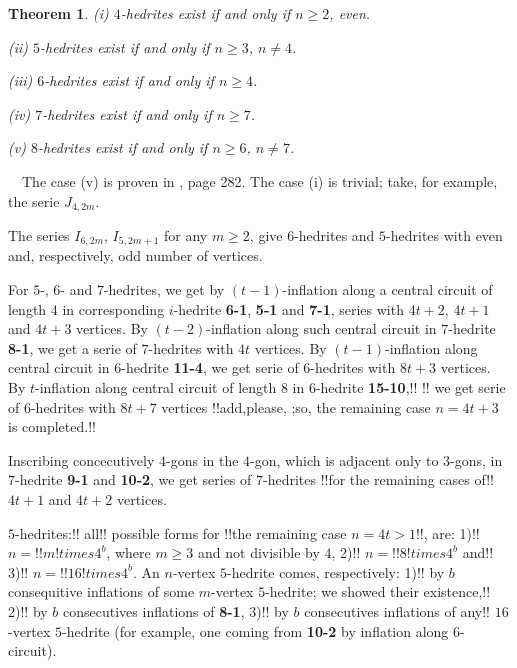 \documentclass[12pt]{article}
\newtheorem{theorem}{Theorem}
\newcommand{\proof}{\noindent{\bf Proof.}\ \ }
\begin{document}
\begin{theorem}

(i) $4$-hedrites exist if and only if $n\geq 2$, even.

(ii) $5$-hedrites exist if and only if $n\geq 3$, $n\not= 4$.

(iii) $6$-hedrites exist if and only if $n\geq 4$.

(iv) $7$-hedrites exist if and only if $n\geq 7$.

(v) $8$-hedrites exist if and only if $n\geq 6$, $n\not= 7$.

\end{theorem}
\proof The case (v) is proven in \cite{Gr}, page 282.
The case (i) is trivial; take, for example, the serie $J_{4,2m}$.

The series $I_{6,2m}$, $I_{5,2m+1}$ for any $m \ge 2$, give $6$-hedrites
and $5$-hedrites with even and, respectively, odd number of vertices.

For $5$-, $6$- and $7$-hedrites, we 
get by $(t-1)$-inflation
along a central circuit of length $4$ in corresponding
$i$-hedrite {\bf 6-1}, {\bf 5-1} and {\bf 7-1},
series with $4t+2$, $4t+1$ and $4t+3$ vertices. 
By $(t-2)$-inflation
along such central circuit in $7$-hedrite {\bf 8-1}, we get a serie of
$7$-hedrites with $4t$ vertices.
By $(t-1)$-inflation along central circuit in $6$-hedrite {\bf 11-4}, we
get serie of $6$-hedrites with $8t+3$ vertices.
By $t$-inflation along central circuit of length $8$ in 
$6$-hedrite {\bf 15-10},!!
!!%
we get serie of $6$-hedrites with $8t+7$ vertices
!!add,please, ;so, the remaining case $n=4t+3$ is completed.!!



Inscribing concecutively $4$-gons in the $4$-gon, which is adjacent only to
$3$-gons, in $7$-hedrite {\bf 9-1} and {\bf 10-2}, we get series of 
$7$-hedrites !!for the remaining cases of!! $4t+1$ and $4t+2$ vertices.

$5$-hedrites:!!
all!! possible forms for !!the remaining case $n=4t>1$!!, are:
1)!! $n=!!m \!!times 4^b$, where $m \ge 3$ and not divisible by $4$,
2)!! $n=!!8 \!!times 4^b$ and!! 3)!! $n=!!16 \!!times 4^b$.
An $n$-vertex $5$-hedrite comes, respectively:
1)!! by $b$ consequitive inflations of some $m$-vertex 
$5$-hedrite; we showed their existence,!!
2)!! by $b$ consecutives inflations of {\bf 8-1},
3)!! by $b$ consecutives inflations of any!! $16$-vertex 
$5$-hedrite (for example, one coming from {\bf 10-2} by inflation along $6$-circuit).
\end{document}
